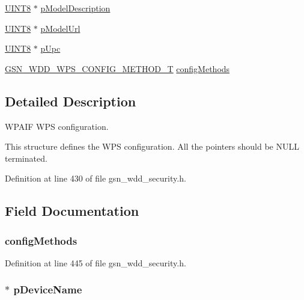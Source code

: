 \begin{DoxyCompactItemize}
\item 
\hyperlink{a00660_gab27e9918b538ce9d8ca692479b375b6a}{UINT8} $\ast$ \hyperlink{a00296_a1f151d37bd0ff988b2d3ffc6980be8d5}{pModelDescription}
\item 
\hyperlink{a00660_gab27e9918b538ce9d8ca692479b375b6a}{UINT8} $\ast$ \hyperlink{a00296_ae906a1a75e7b52847010abf2788dfb68}{pModelUrl}
\item 
\hyperlink{a00660_gab27e9918b538ce9d8ca692479b375b6a}{UINT8} $\ast$ \hyperlink{a00296_a785807e9bd8686cba78d8fee5df61863}{pUpc}
\item 
\hyperlink{a00604_af1a232708dd0046ccf280fe0ce117171}{GSN\_\-WDD\_\-WPS\_\-CONFIG\_\-METHOD\_\-T} \hyperlink{a00296_ad856a949398af53817b9a41dbb5dee2e}{configMethods}
\end{DoxyCompactItemize}


\subsection{Detailed Description}
WPAIF WPS configuration. 

This structure defines the WPS configuration. All the pointers should be NULL terminated. 

Definition at line 430 of file gsn\_\-wdd\_\-security.h.



\subsection{Field Documentation}
\hypertarget{a00296_ad856a949398af53817b9a41dbb5dee2e}{
\subsubsection[{configMethods}]{ {\bf configMethods}}}
\label{a00296_ad856a949398af53817b9a41dbb5dee2e}


Definition at line 445 of file gsn\_\-wdd\_\-security.h.

\hypertarget{a00296_a0690be2839815861009b4509a038fe1a}{
\subsubsection[{pDeviceName}]{$\ast$ {\bf pDeviceName}}}
\label{a00296_a0690be2839815861009b4509a038fe1a}


